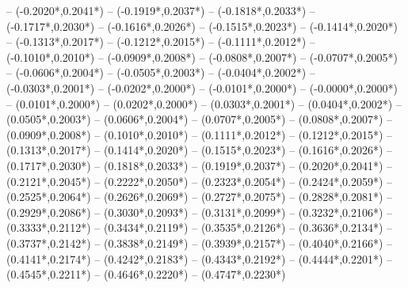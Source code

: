 {	-- ({-0.2020*\dx},{0.2041*\dy})
	-- ({-0.1919*\dx},{0.2037*\dy})
	-- ({-0.1818*\dx},{0.2033*\dy})
	-- ({-0.1717*\dx},{0.2030*\dy})
	-- ({-0.1616*\dx},{0.2026*\dy})
	-- ({-0.1515*\dx},{0.2023*\dy})
	-- ({-0.1414*\dx},{0.2020*\dy})
	-- ({-0.1313*\dx},{0.2017*\dy})
	-- ({-0.1212*\dx},{0.2015*\dy})
	-- ({-0.1111*\dx},{0.2012*\dy})
	-- ({-0.1010*\dx},{0.2010*\dy})
	-- ({-0.0909*\dx},{0.2008*\dy})
	-- ({-0.0808*\dx},{0.2007*\dy})
	-- ({-0.0707*\dx},{0.2005*\dy})
	-- ({-0.0606*\dx},{0.2004*\dy})
	-- ({-0.0505*\dx},{0.2003*\dy})
	-- ({-0.0404*\dx},{0.2002*\dy})
	-- ({-0.0303*\dx},{0.2001*\dy})
	-- ({-0.0202*\dx},{0.2000*\dy})
	-- ({-0.0101*\dx},{0.2000*\dy})
	-- ({-0.0000*\dx},{0.2000*\dy})
	-- ({0.0101*\dx},{0.2000*\dy}) %
	-- ({0.0202*\dx},{0.2000*\dy}) %
	-- ({0.0303*\dx},{0.2001*\dy}) %
	-- ({0.0404*\dx},{0.2002*\dy}) %
	-- ({0.0505*\dx},{0.2003*\dy}) %
	-- ({0.0606*\dx},{0.2004*\dy}) %
	-- ({0.0707*\dx},{0.2005*\dy}) %
	-- ({0.0808*\dx},{0.2007*\dy}) %
	-- ({0.0909*\dx},{0.2008*\dy}) %
	-- ({0.1010*\dx},{0.2010*\dy}) %
	-- ({0.1111*\dx},{0.2012*\dy}) %
	-- ({0.1212*\dx},{0.2015*\dy}) %
	-- ({0.1313*\dx},{0.2017*\dy}) %
	-- ({0.1414*\dx},{0.2020*\dy}) %
	-- ({0.1515*\dx},{0.2023*\dy}) %
	-- ({0.1616*\dx},{0.2026*\dy}) %
	-- ({0.1717*\dx},{0.2030*\dy}) %
	-- ({0.1818*\dx},{0.2033*\dy}) %
	-- ({0.1919*\dx},{0.2037*\dy}) %
	-- ({0.2020*\dx},{0.2041*\dy}) %
	-- ({0.2121*\dx},{0.2045*\dy}) %
	-- ({0.2222*\dx},{0.2050*\dy}) %
	-- ({0.2323*\dx},{0.2054*\dy}) %
	-- ({0.2424*\dx},{0.2059*\dy}) %
	-- ({0.2525*\dx},{0.2064*\dy}) %
	-- ({0.2626*\dx},{0.2069*\dy}) %
	-- ({0.2727*\dx},{0.2075*\dy}) %
	-- ({0.2828*\dx},{0.2081*\dy}) %
	-- ({0.2929*\dx},{0.2086*\dy}) %
	-- ({0.3030*\dx},{0.2093*\dy}) %
	-- ({0.3131*\dx},{0.2099*\dy}) %
	-- ({0.3232*\dx},{0.2106*\dy}) %
	-- ({0.3333*\dx},{0.2112*\dy}) %
	-- ({0.3434*\dx},{0.2119*\dy}) %
	-- ({0.3535*\dx},{0.2126*\dy}) %
	-- ({0.3636*\dx},{0.2134*\dy}) %
	-- ({0.3737*\dx},{0.2142*\dy}) %
	-- ({0.3838*\dx},{0.2149*\dy}) %
	-- ({0.3939*\dx},{0.2157*\dy}) %
	-- ({0.4040*\dx},{0.2166*\dy}) %
	-- ({0.4141*\dx},{0.2174*\dy}) %
	-- ({0.4242*\dx},{0.2183*\dy}) %
	-- ({0.4343*\dx},{0.2192*\dy}) %
	-- ({0.4444*\dx},{0.2201*\dy}) %
	-- ({0.4545*\dx},{0.2211*\dy}) %
	-- ({0.4646*\dx},{0.2220*\dy}) %
	-- ({0.4747*\dx},{0.2230*\dy}) %
}
